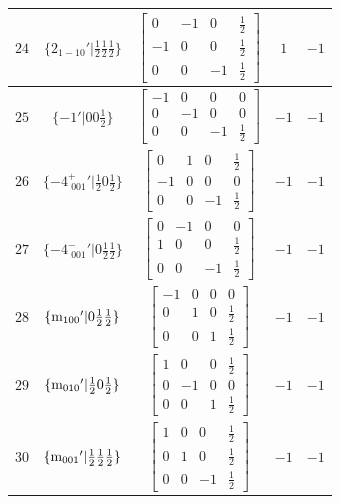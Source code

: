 \documentclass[fleqn,8pt]{jsarticle}
\begin{document}
\begin{longtable}{ccccc}
$ 24 $ & $ \{2{}_{1-10}{}'|\frac{1}{2} \frac{1}{2} \frac{1}{2}\} $ & $ \begin{bmatrix} 0 & -1 & 0 & \frac{1}{2} \\ -1 & 0 & 0 & \frac{1}{2} \\ 0 & 0 & -1 & \frac{1}{2} \end{bmatrix} $ & $ 1 $ & $ -1 $ \\ \hline
$ 25 $ & $ \{-1{}'|0 0 \frac{1}{2}\} $ & $ \begin{bmatrix} -1 & 0 & 0 & 0 \\ 0 & -1 & 0 & 0 \\ 0 & 0 & -1 & \frac{1}{2} \end{bmatrix} $ & $ -1 $ & $ -1 $ \\ \hline
$ 26 $ & $ \{-4^{+}_{\,\,001}{}'|\frac{1}{2} 0 \frac{1}{2}\} $ & $ \begin{bmatrix} 0 & 1 & 0 & \frac{1}{2} \\ -1 & 0 & 0 & 0 \\ 0 & 0 & -1 & \frac{1}{2} \end{bmatrix} $ & $ -1 $ & $ -1 $ \\ \hline
$ 27 $ & $ \{-4^{-}_{\,\,001}{}'|0 \frac{1}{2} \frac{1}{2}\} $ & $ \begin{bmatrix} 0 & -1 & 0 & 0 \\ 1 & 0 & 0 & \frac{1}{2} \\ 0 & 0 & -1 & \frac{1}{2} \end{bmatrix} $ & $ -1 $ & $ -1 $ \\ \hline
$ 28 $ & $ \{{\rm m}_{100}{}'|0 \frac{1}{2} \frac{1}{2}\} $ & $ \begin{bmatrix} -1 & 0 & 0 & 0 \\ 0 & 1 & 0 & \frac{1}{2} \\ 0 & 0 & 1 & \frac{1}{2} \end{bmatrix} $ & $ -1 $ & $ -1 $ \\ \hline
$ 29 $ & $ \{{\rm m}_{010}{}'|\frac{1}{2} 0 \frac{1}{2}\} $ & $ \begin{bmatrix} 1 & 0 & 0 & \frac{1}{2} \\ 0 & -1 & 0 & 0 \\ 0 & 0 & 1 & \frac{1}{2} \end{bmatrix} $ & $ -1 $ & $ -1 $ \\ \hline
$ 30 $ & $ \{{\rm m}_{001}{}'|\frac{1}{2} \frac{1}{2} \frac{1}{2}\} $ & $ \begin{bmatrix} 1 & 0 & 0 & \frac{1}{2} \\ 0 & 1 & 0 & \frac{1}{2} \\ 0 & 0 & -1 & \frac{1}{2} \end{bmatrix} $ & $ -1 $ & $ -1 $ \\ \hline

\end{longtable}
\end{document}
